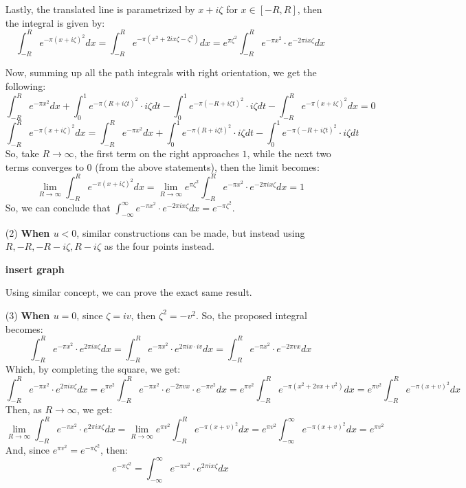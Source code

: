 \documentclass{article}
\begin{document}
\begin{itemize}
    \hfil

    Lastly, the translated line is parametrized by $x+i\zeta$ for $x\in [-R,R]$, then the integral is given by:
    $$\int_{-R}^{R}e^{-\pi(x+i\zeta)^2}dx = \int_{-R}^{R}e^{-\pi(x^2+2ix\zeta - \zeta^2)}dx = e^{\pi\zeta^2}\int_{-R}^{R}e^{-\pi x^2}\cdot e^{-2\pi ix\zeta}dx$$
    
    \hfil

    Now, summing up all the path integrals with right orientation, we get the following:
    $$\int_{-R}^{R}e^{-\pi x^2}dx+\int_{0}^{1}e^{-\pi(R+i\zeta t)^2}\cdot i\zeta dt -\int_{0}^{1}e^{-\pi(-R+i\zeta t)^2}\cdot i\zeta dt-\int_{-R}^{R}e^{-\pi(x+i\zeta)^2}dx=0$$
    $$\int_{-R}^{R}e^{-\pi(x+i\zeta)^2}dx=\int_{-R}^{R}e^{-\pi x^2}dx+\int_{0}^{1}e^{-\pi(R+i\zeta t)^2}\cdot i\zeta dt -\int_{0}^{1}e^{-\pi(-R+i\zeta t)^2}\cdot i\zeta dt$$
    So, take $R\rightarrow\infty$, the first term on the right approaches $1$, while the next two terms converges to $0$ (from the above statements), then the limit becomes:
    $$\lim_{R\rightarrow\infty}\int_{-R}^{R}e^{-\pi(x+i\zeta)^2}dx = \lim_{R\rightarrow\infty}e^{\pi\zeta^2}\int_{-R}^{R}e^{-\pi x^2}\cdot e^{-2\pi ix\zeta}dx = 1$$
    So, we can conclude that $\int_{-\infty}^{\infty}e^{-\pi x^2}\cdot e^{-2\pi ix\zeta}dx = e^{-\pi\zeta^2}$.

    \hfil

    \item[(2)] \textbf{When $u<0$}, similar constructions can be made, but instead using $R,-R,-R-i\zeta,R-i\zeta$ as the four points instead.
    
    \textbf{insert graph}

    Using similar concept, we can prove the exact same result.

    \hfil
    
    \item[(3)] \textbf{When $u=0$}, since $\zeta=iv$, then $\zeta^2 = -v^2$. So, the proposed integral becomes:
    $$\int_{-R}^{R}e^{-\pi x^2}\cdot e^{2\pi ix\zeta}dx = \int_{-R}^{R}e^{-\pi x^2}\cdot e^{2\pi ix\cdot iv}dx = \int_{-R}^{R}e^{-\pi x^2}\cdot e^{-2\pi vx}dx$$
    Which, by completing the square, we get:
    $$\int_{-R}^{R}e^{-\pi x^2}\cdot e^{2\pi ix\zeta}dx = e^{\pi v^2}\int_{-R}^{R}e^{-\pi x^2}\cdot e^{-2\pi vx}\cdot e^{-\pi v^2}dx = e^{\pi v^2}\int_{-R}^{R}e^{-\pi(x^2+2vx+v^2)}dx = e^{\pi v^2}\int_{-R}^{R}e^{-\pi(x+v)^2}dx$$
    Then, as $R\rightarrow\infty$, we get:
    $$\lim_{R\rightarrow\infty}\int_{-R}^{R}e^{-\pi x^2}\cdot e^{2\pi ix\zeta}dx=\lim_{R\rightarrow\infty}e^{\pi v^2}\int_{-R}^{R}e^{-\pi(x+v)^2}dx = e^{\pi v^2}\int_{-\infty}^{\infty}e^{-\pi(x+v)^2}dx = e^{\pi v^2}$$
    And, since $e^{\pi v^2}=e^{-\pi \zeta^2}$, then:
    $$e^{-\pi \zeta^2} = \int_{-\infty}^{\infty}e^{-\pi x^2}\cdot e^{2\pi ix\zeta}dx$$
\end{itemize}
\end{document}
